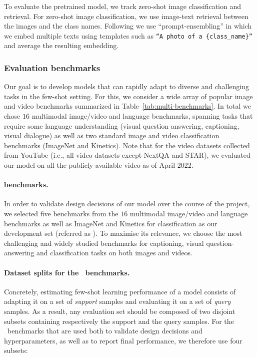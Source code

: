 To evaluate the pretrained model, we track zero-shot image classification and retrieval. 
For zero-shot image classification, we use image-text retrieval between the images and the class names. 
Following \citet{clip} we use ``prompt-ensembling'' in which we embed multiple texts using templates such as \texttt{\color{greencode}``A photo of a \{class\_name\}''} and average the resulting embedding.

\subsubsection{Evaluation benchmarks}
\label{sec:eval_benchmarks}



Our goal is to develop models that can rapidly adapt to diverse and challenging tasks in the few-shot setting. 
For this, we consider a wide array of popular image and video benchmarks summarized in Table~\ref{tab:multi-benchmarks}.
In total we chose $16$ multimodal image/video and language benchmarks, spanning tasks that require some language understanding (visual question answering, captioning, visual dialogue) as well as two standard image and video classification benchmarks (ImageNet and Kinetics).
Note that for the video datasets collected from YouTube (i.e., all video datasets except NextQA and STAR), we evaluated our model on all the publicly available video as of April 2022.

\paragraph{\dev{} benchmarks.}
In order to validate design decisions of our model over the course of the project, we selected five benchmarks from the $16$ multimodal image/video and language benchmarks as well as ImageNet and Kinetics for classification as our development set (referred as \dev{}).
To maximise its relevance, we choose the most challenging and widely studied benchmarks for captioning, visual question-answering and classification tasks on both images and videos.

\paragraph{Dataset splits for the \dev~benchmarks.} 
Concretely, estimating few-shot learning performance of a model consists of adapting it on a set of \emph{support} samples and evaluating it on a set of \emph{query} samples. 
As a result, any evaluation set should be composed of two disjoint subsets containing respectively the support and the query samples.
For the \dev~benchmarks that are used both
to validate design decisions and hyperparameters, 
as well as to report final performance,
we therefore use four subsets:

